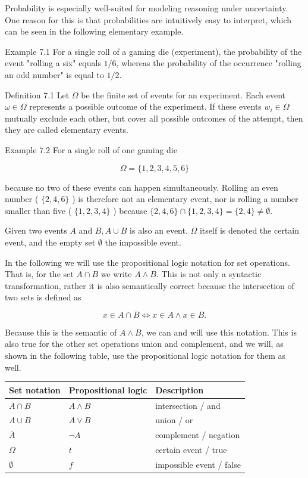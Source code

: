 \documentclass[10pt]{article}
\begin{document}
Probability is especially well-suited for modeling reasoning under uncertainty. One reason for this is that probabilities are intuitively easy to interpret, which can be seen in the following elementary example.

Example 7.1 For a single roll of a gaming die (experiment), the probability of the event "rolling a six" equals $1 / 6$, whereas the probability of the occurrence "rolling an odd number" is equal to $1 / 2$.

Definition 7.1 Let $\Omega$ be the finite set of events for an experiment. Each event $\omega \in \Omega$ represents a possible outcome of the experiment. If these events $w_{i} \in \Omega$ mutually exclude each other, but cover all possible outcomes of the attempt, then they are called elementary events.

Example 7.2 For a single roll of one gaming die


$$
\Omega=\{1,2,3,4,5,6\}
$$

because no two of these events can happen simultaneously. Rolling an even number ( $\{2,4,6\}$ ) is therefore not an elementary event, nor is rolling a number smaller than five ( $\{1,2,3,4\}$ ) because $\{2,4,6\} \cap\{1,2,3,4\}=\{2,4\} \neq \emptyset$.

Given two events $A$ and $B, A \cup B$ is also an event. $\Omega$ itself is denoted the certain event, and the empty set $\emptyset$ the impossible event.

In the following we will use the propositional logic notation for set operations. That is, for the set $A \cap B$ we write $A \wedge B$. This is not only a syntactic transformation, rather it is also semantically correct because the intersection of two sets is defined as

$$
x \in A \cap B \Leftrightarrow x \in A \wedge x \in B .
$$

Because this is the semantic of $A \wedge B$, we can and will use this notation. This is also true for the other set operations union and complement, and we will, as shown in the following table, use the propositional logic notation for them as well.

\begin{center}
\begin{tabular}{|l|l|l|}
\hline
Set notation & Propositional logic & Description \\
\hline
$A \cap B$ & $A \wedge B$ & intersection / and \\
\hline
$A \cup B$ & $A \vee B$ & union / or \\
\hline
$\bar{A}$ & $\neg A$ & complement / negation \\
\hline
$\Omega$ & $t$ & certain event / true \\
\hline
$\emptyset$ & $f$ & impossible event / false \\
\hline
\end{tabular}
\end{center}
\end{document}
